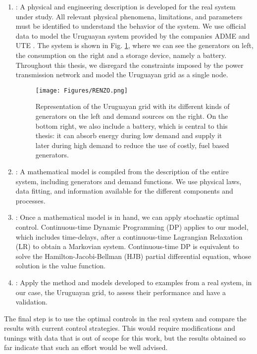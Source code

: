 \begin{enumerate}

\item[Step 1]: A physical and engineering description is developed for the real 
system under study. All relevant physical phenomena, limitations, and parameters
 must be identified to understand the behavior of the system. We use official 
 data to model the Uruguayan system provided by the companies ADME \cite{ADME} and UTE \cite{UTE}. The system is shown in Fig. \ref{fig:pptfigure}, where we can see the generators on left, the consumption on the right and a storage device, namely a battery. Throughout this thesis, we disregard the constraints imposed by the power transmission network and model the Uruguayan grid as a single node.
\begin{figure}[ht!]
\centering
\texttt{[image: Figures/RENZO.png]}
\caption{Representation of the Uruguayan grid with its different kinds of generators on the left and demand sources on the right. On the bottom right, we also include a battery, which is central to this thesis: it can absorb energy during low demand and supply it later during high demand to reduce the use of costly, fuel based generators.}
\label{fig:pptfigure}
\end{figure}

\item[Step 2]: A mathematical model is compiled from the description of the entire 
system, including generators and demand functions. We use physical laws, data fitting, and 
information available for the different components and processes.

\item[Step 3]: Once a mathematical model is in hand, 
we can apply stochastic optimal control. Continuous-time Dynamic Programming (DP)
applies to our model, which includes time-delays,
after a continuous-time Lagrangian Relaxation (LR) to obtain a 
Markovian system. Continuous-time DP is equivalent to solve the Hamilton-Jacobi-Bellman 
(HJB) partial differential equation, whose solution is the value function.

\item[Step 4]: Apply the method and models developed to examples from a real system, in our case, the Uruguayan grid, to assess their performance and have a validation.

\end{enumerate} 
The final step  is to use the optimal controls in the real system and compare
the results with current control strategies. This would require
modifications and tunings with data that is out of scope for this work, but the results
obtained so far indicate that such an effort would be well advised.